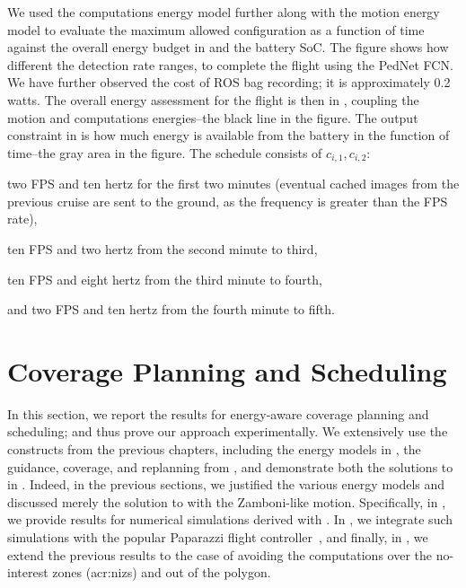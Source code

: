 We used the computations energy model further along with the motion energy model to evaluate the maximum allowed configuration as a function of time against the overall energy budget in  and the battery SoC. The figure shows how different the detection rate ranges, to complete the flight using the PedNet FCN. We have further observed the cost of ROS bag recording; it is approximately 0.2 watts.
The overall energy assessment for the flight is then in , coupling the motion and computations energies--the black line in the figure. The output constraint in  is how much energy is available from the battery in the function of time--the gray area in the figure. The schedule consists of $c_{i,1},c_{i,2}$: 
\begin{enumerate*}[label={(\alph*)},font={\textit}]
  \item two FPS and ten hertz for the first two minutes (eventual cached images from the previous cruise are sent to the ground, as the frequency is greater than the FPS rate),
  \item ten FPS and two hertz from the second minute to third,
  \item ten FPS and eight hertz from the third minute to fourth, 
  \item and two FPS and ten hertz from the fourth minute to fifth.
\end{enumerate*}


\section{Coverage Planning and Scheduling}
\label{sec:res-dyn}

In this section, we report the results for energy-aware coverage planning and scheduling; and thus prove our approach experimentally. We extensively use the constructs from the previous chapters, including the energy models in , the guidance, coverage, and replanning from , and demonstrate both the solutions to  in . Indeed, in the previous sections, we justified the various energy models and discussed merely the solution to  with the Zamboni-like motion. Specifically, in , we provide results for numerical simulations derived with \matlab. In , we integrate such simulations with the popular Paparazzi flight controller~\citep{papa}, and finally, in , we extend the previous results to the case of avoiding the computations over the no-interest zones (\Gls{acr:niz}s) and out of the polygon.


